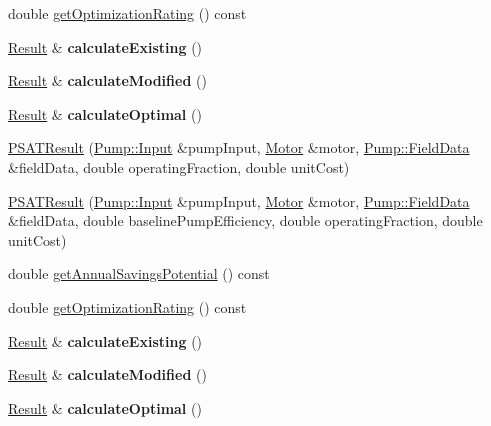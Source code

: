 \begin{DoxyCompactItemize}
\item 
double \hyperlink{class_p_s_a_t_result_aa0a7001461408fcb06a6c22ce2d064db}{get\+Optimization\+Rating} () const
\item 
\mbox{\label{class_p_s_a_t_result_a949922caf29949199a5de2902851ceb2}} 
\hyperlink{struct_p_s_a_t_result_1_1_result}{Result} \& {\bfseries calculate\+Existing} ()
\item 
\mbox{\label{class_p_s_a_t_result_a37c2bab0e67ac4feb4f04d77aa6a4d77}} 
\hyperlink{struct_p_s_a_t_result_1_1_result}{Result} \& {\bfseries calculate\+Modified} ()
\item 
\mbox{\label{class_p_s_a_t_result_a81e6c5490fba37b6471a3cea98114823}} 
\hyperlink{struct_p_s_a_t_result_1_1_result}{Result} \& {\bfseries calculate\+Optimal} ()
\item 
\hyperlink{class_p_s_a_t_result_a17778ac130aac171695917a28ffce312}{P\+S\+A\+T\+Result} (\hyperlink{struct_pump_1_1_input}{Pump\+::\+Input} \&pump\+Input, \hyperlink{struct_motor}{Motor} \&motor, \hyperlink{struct_pump_1_1_field_data}{Pump\+::\+Field\+Data} \&field\+Data, double operating\+Fraction, double unit\+Cost)
\item 
\hyperlink{class_p_s_a_t_result_a33c00a85d9c0fd4e8ba444e1a2ccd591}{P\+S\+A\+T\+Result} (\hyperlink{struct_pump_1_1_input}{Pump\+::\+Input} \&pump\+Input, \hyperlink{struct_motor}{Motor} \&motor, \hyperlink{struct_pump_1_1_field_data}{Pump\+::\+Field\+Data} \&field\+Data, double baseline\+Pump\+Efficiency, double operating\+Fraction, double unit\+Cost)
\item 
double \hyperlink{class_p_s_a_t_result_a14fc75c2e0e92f74e3df1b97ed13b496}{get\+Annual\+Savings\+Potential} () const
\item 
double \hyperlink{class_p_s_a_t_result_aa0a7001461408fcb06a6c22ce2d064db}{get\+Optimization\+Rating} () const
\item 
\mbox{\label{class_p_s_a_t_result_a949922caf29949199a5de2902851ceb2}} 
\hyperlink{struct_p_s_a_t_result_1_1_result}{Result} \& {\bfseries calculate\+Existing} ()
\item 
\mbox{\label{class_p_s_a_t_result_a37c2bab0e67ac4feb4f04d77aa6a4d77}} 
\hyperlink{struct_p_s_a_t_result_1_1_result}{Result} \& {\bfseries calculate\+Modified} ()
\item 
\mbox{\label{class_p_s_a_t_result_a81e6c5490fba37b6471a3cea98114823}} 
\hyperlink{struct_p_s_a_t_result_1_1_result}{Result} \& {\bfseries calculate\+Optimal} ()
\end{DoxyCompactItemize}


